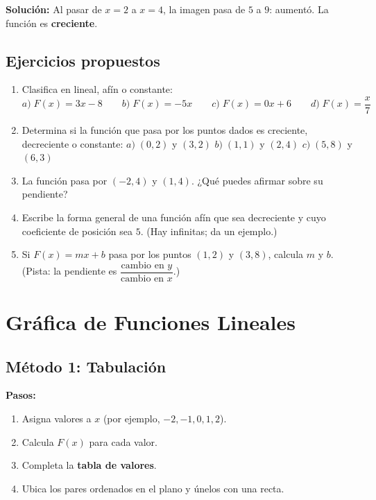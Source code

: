 \documentclass[12pt, letterpaper]{article}
\begin{document}
\begin{cuadrosolucion}
  \textbf{Solución:} Al pasar de $x = 2$ a $x = 4$, la imagen pasa de $5$ a $9$: aumentó. La función es \textbf{creciente}.
\end{cuadrosolucion}

\subsection{Ejercicios propuestos}

\begin{enumerate}[leftmargin=*, resume]
  \item \facil{} Clasifica en lineal, afín o constante: $a) \; F(x) = 3x - 8 \qquad b) \; F(x) = -5x \qquad c) \; F(x) = 0x + 6 \qquad d) \; F(x) = \dfrac{x}{7}$

  \item \facil{} Determina si la función que pasa por los puntos dados es creciente, decreciente o constante: $a) \; (0, 2)$ y $(3, 2)$ \quad $b) \; (1, 1)$ y $(2, 4)$ \quad $c) \; (5, 8)$ y $(6, 3)$

  \item \medio{} La función pasa por $(-2, 4)$ y $(1, 4)$. ¿Qué puedes afirmar sobre su pendiente?

  \item \medio{} Escribe la forma general de una función afín que sea decreciente y cuyo coeficiente de posición sea $5$. (Hay infinitas; da un ejemplo.)

  \item \dificil{} Si $F(x) = mx + b$ pasa por los puntos $(1, 2)$ y $(3, 8)$, calcula $m$ y $b$. (Pista: la pendiente es $\dfrac{\text{cambio en } y}{\text{cambio en } x}$.)
\end{enumerate}


\section{Gráfica de Funciones Lineales}

\subsection{Método 1: Tabulación}

\begin{cuadropasos}
  \textbf{Pasos:}
  \begin{enumerate}[leftmargin=*]
    \item Asigna valores a $x$ (por ejemplo, $-2, -1, 0, 1, 2$).
    \item Calcula $F(x)$ para cada valor.
    \item Completa la \textbf{tabla de valores}.
    \item Ubica los pares ordenados en el plano y únelos con una recta.
  \end{enumerate}
\end{cuadropasos}
\end{document}
